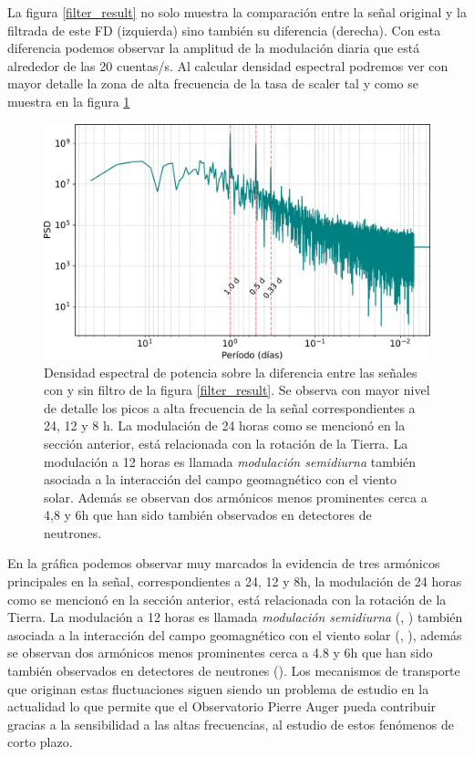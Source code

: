 La figura \ref{filter_result} no solo muestra la comparación entre la señal original y la filtrada de este FD (izquierda)  sino también su diferencia (derecha). Con esta diferencia podemos observar la amplitud de la modulación diaria que está alrededor de las 20 cuentas/s. Al calcular densidad espectral podremos ver con mayor detalle la zona de alta frecuencia de la tasa de scaler tal y como se muestra en la figura \ref{forbush_filter}

\begin{figure}
\centering
\includegraphics[width=1\linewidth]{Figs/Figr/forbush_difference_FFT.pdf}
    \caption{Densidad espectral de potencia sobre la diferencia entre las señales con y sin filtro de la figura \ref{filter_result}. Se observa con mayor nivel de detalle los picos a alta frecuencia de la señal correspondientes a 24, 12 y 8 h. La modulación de 24 horas como se mencionó en la sección anterior, está relacionada con la rotación de la Tierra. La modulación a 12 horas es llamada \textit{modulación semidiurna} también asociada a la interacción del campo geomagnético con el viento solar. Además se observan dos armónicos menos prominentes cerca a 4,8 y 6h que han sido también observados en  detectores de neutrones.} 
    \label{forbush_filter}
    \end{figure}
En la gráfica podemos observar muy marcados la evidencia de tres armónicos principales en la señal, correspondientes a 24, 12 y 8h, la modulación de 24 horas como se mencionó en la sección anterior, está relacionada con la rotación de la Tierra. La modulación a 12 horas es llamada \textit{modulación semidiurna} (\cite{nicolson_1948}, \cite{grieder_2001}) también asociada a la interacción del campo geomagnético con el viento solar (\cite{singh_2015}, \cite{sarabhai_1953}), además se observan dos armónicos menos prominentes cerca a 4.8 y 6h que han sido también observados en  detectores de neutrones (\cite{shalaby_2022}). Los mecanismos de transporte que originan estas fluctuaciones siguen siendo un problema de estudio en la actualidad lo que permite que el Observatorio Pierre Auger pueda contribuir  gracias a la sensibilidad a las altas frecuencias, al estudio de estos fenómenos de corto plazo.

